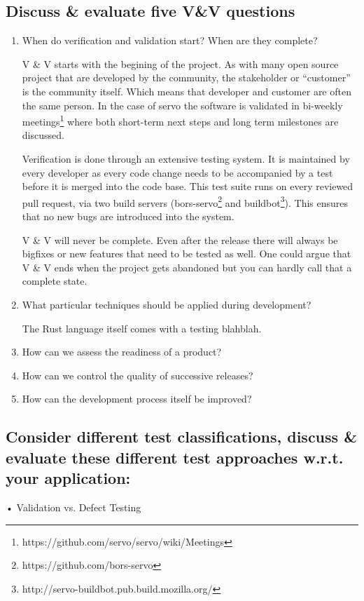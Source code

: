\documentclass{scrartcl}
\begin{document}
\subsection{Discuss \& evaluate five V\&V questions}
\begin{enumerate}
  \item When do verification and validation start? When are they complete?
  
  V \& V starts with the begining of the project. As with many open source project that are developed by the community, the stakeholder or ``customer'' is the community itself. Which means that developer and customer are often the same person. In the case of servo the software is validated in bi-weekly meetings\footnote{https://github.com/servo/servo/wiki/Meetings} where both short-term next steps and long term milestones are discussed.
  
  Verification is done through an extensive testing system. It is maintained by every developer as every code change needs to be accompanied by a test before it is merged into the code base. This test suite runs on every reviewed pull request, via two build servers (bors-servo\footnote{https://github.com/bors-servo} and buildbot\footnote{http://servo-buildbot.pub.build.mozilla.org/}). This ensures that no new bugs are introduced into the system.
  
V \& V will never be complete. Even after the release there will always be bigfixes or new features that need to be tested as well. One could argue that V \& V ends when the project gets abandoned but you can hardly call that a complete state.
  \item What particular techniques should be applied during development?
  
  The Rust language itself comes with a testing blahblah.
  \item How can we assess the readiness of a product?
  \item How can we control the quality of successive releases?
  \item How can the development process itself be improved?
\end{enumerate}
\subsection{Consider different test classifications, discuss \& evaluate these different test approaches w.r.t. your application:}

• Validation vs. Defect Testing
\end{document}
